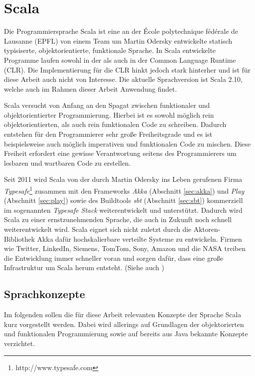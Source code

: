 \section{Scala}

Die Programmiersprache Scala ist eine an der École polytechnique fédérale de Lausanne (EPFL) von
einem Team um Martin Odersky entwickelte statisch typisiserte,  objektorientierte, funktionale
Sprache. In Scala entwickelte Programme laufen  sowohl in der  als auch in der Common
Language Runtime (CLR). Die Implementierung für die CLR hinkt jedoch stark  hinterher und ist für
diese Arbeit auch nicht von Interesse. Die aktuelle Sprachversion ist Scala 2.10, welche auch im
Rahmen dieser Arbeit Anwendung findet.

Scala versucht von Anfang an den Spagat zwischen funktionaler und  objektorientierter
Programmierung. Hierbei ist es sowohl möglich  rein objektorientierten, als auch rein funktionalen
Code zu schreiben. Dadurch  entstehen für den Programmierer sehr große Freiheitsgrade und es ist
beispielsweise auch möglich imperativen und funktionalen Code zu mischen. Diese  Freiheit erfordert
eine gewisse Verantwortung seitens des Programmierers um  lesbaren und wartbaren Code zu erstellen.

Seit 2011 wird Scala von der durch Martin Odersky ins Leben gerufenen Firma
\textit{Typesafe}\footnote{http://www.typesafe.com} zusammen mit den Frameworks \textit{Akka}
(Abschnitt \ref{sec:akka}) und \textit{Play} (Abschnitt \ref{sec:play}) sowie des Buildtools
\textit{sbt} (Abschnitt \ref{sec:sbt}) kommerziell im sogenannten \textit{Typesafe Stack}
weiterentwickelt und unterstützt. Dadurch wird Scala zu einer ernstzunehmenden Sprache, die auch in
Zukunft noch schnell weiterentwickelt wird. Scala eignet sich nicht zuletzt durch die Aktoren-
Bibliothek Akka dafür hochskalierbare verteilte Systeme zu entwickeln. Firmen wie Twitter, LinkedIn,
Siemens, TomTom, Sony, Amazon und die NASA treiben die Entwicklung immer schneller voran und sorgen
dafür, dass eine große Infrastruktur um Scala herum entsteht. (Siehe auch \cite{scala})

\subsection{Sprachkonzepte}

Im folgenden sollen die für diese Arbeit relevanten Konzepte der Sprache Scala kurz vorgestellt
werden. Dabei wird allerings auf Grundlagen der objektorierten und funktionalen Programmierung sowie
auf bereits aus Java bekannte Konzepte verzichtet.

